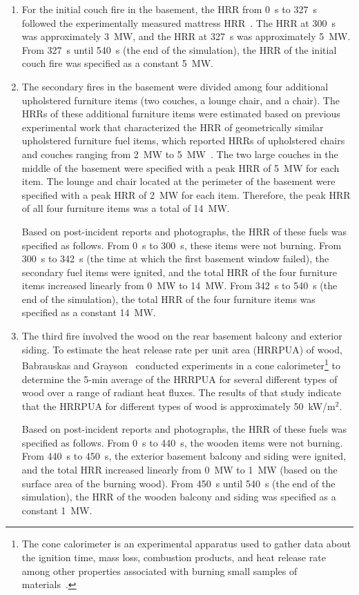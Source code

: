 \documentclass[12pt,oneside]{book}
\begin{document}
\begin{enumerate}
\item For the initial couch fire in the basement, the HRR from 0~s to 327~s followed the experimentally measured mattress HRR~\cite{madrzykowski2009fire}. The HRR at 300~s was approximately 3~MW, and the HRR at 327~s was approximately 5~MW. From 327~s until 540~s (the end of the simulation), the HRR of the initial couch fire was specified as a constant 5~MW.

\item The secondary fires in the basement were divided among four additional upholstered furniture items (two couches, a lounge chair, and a chair). The HRRs of these additional furniture items were estimated based on previous experimental work that characterized the HRR of geometrically similar upholstered furniture fuel items, which reported HRRs of upholstered chairs and couches ranging from 2~MW to 5~MW~\cite{madrzykowski2009fire,Madrzykowski:2,Babrauskas:1,Janssens:2012}. The two large couches in the middle of the basement were specified with a peak HRR of 5~MW for each item. The lounge and chair located at the perimeter of the basement were specified with a peak HRR of 2~MW for each item. Therefore, the peak HRR of all four furniture items was a total of 14~MW.

Based on post-incident reports and photographs, the HRR of these fuels was specified as follows. From 0~s to 300~s, these items were not burning. From 300~s to 342~s (the time at which the first basement window failed), the secondary fuel items were ignited, and the total HRR of the four furniture items increased linearly from 0~MW to 14~MW. From 342~s to 540~s (the end of the simulation), the total HRR of the four furniture items was specified as a constant 14~MW.

\item The third fire involved the wood on the rear basement balcony and exterior siding. To estimate the heat release rate per unit area (HRRPUA) of wood, Babrauskas and Grayson~\cite{babrauskas1990} conducted experiments in a cone calorimeter\footnote{The cone calorimeter is an experimental apparatus used to gather data about the ignition time, mass loss, combustion products, and heat release rate among other properties associated with burning small samples of materials~\cite{ASTM:E1355}.} to determine the 5-min average of the HRRPUA for several different types of wood over a range of radiant heat fluxes. The results of that study indicate that the HRRPUA for different types of wood is approximately 50~kW/m$^2$.

Based on post-incident reports and photographs, the HRR of these fuels was specified as follows. From 0~s to 440~s, the wooden items were not burning. From 440~s to 450~s, the exterior basement balcony and siding were ignited, and the total HRR increased linearly from 0~MW to 1~MW (based on the surface area of the burning wood). From 450~s until 540~s (the end of the simulation), the HRR of the wooden balcony and siding was specified as a constant 1~MW.
\end{enumerate}
\end{document}
